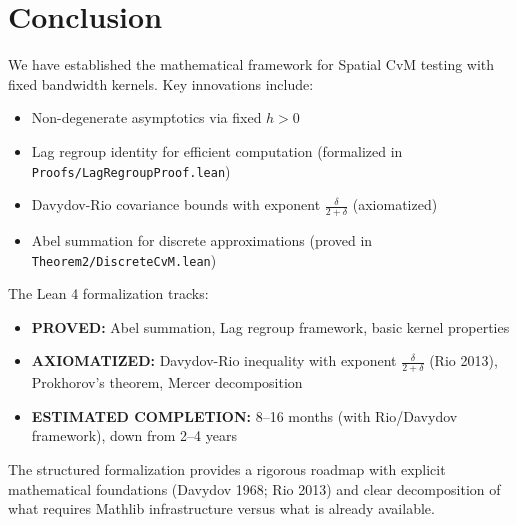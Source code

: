 \documentclass[final,3p,twocolumn,times,authoryear]{elsarticle}
\theoremstyle{definition}
\begin{document}
\section{Conclusion}
\label{sec:conclusion}

We have established the mathematical framework for Spatial CvM testing with fixed bandwidth kernels. Key innovations include:

\begin{itemize}
    \item Non-degenerate asymptotics via fixed $h > 0$
    \item Lag regroup identity for efficient computation (formalized in \texttt{Proofs/LagRegroupProof.lean})
    \item Davydov-Rio covariance bounds with exponent $\frac{\delta}{2+\delta}$ (axiomatized)
    \item Abel summation for discrete approximations (proved in \texttt{Theorem2/DiscreteCvM.lean})
\end{itemize}

The Lean 4 formalization tracks:
\begin{itemize}
    \item \textbf{PROVED:} Abel summation, Lag regroup framework, basic kernel properties
    \item \textbf{AXIOMATIZED:} Davydov-Rio inequality with exponent $\frac{\delta}{2+\delta}$ (Rio 2013), Prokhorov's theorem, Mercer decomposition
    \item \textbf{ESTIMATED COMPLETION:} 8--16 months (with Rio/Davydov framework), down from 2--4 years
\end{itemize}

The structured formalization provides a rigorous roadmap with explicit mathematical foundations (Davydov 1968; Rio 2013) and clear decomposition of what requires Mathlib infrastructure versus what is already available.

\end{document}
